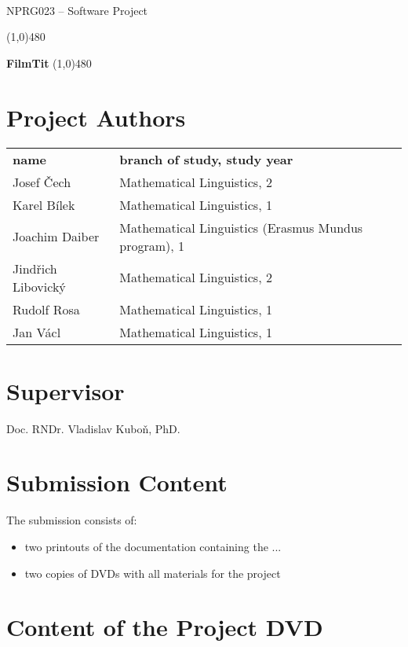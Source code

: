 \documentclass[11pt, oneside]{article}
\begin{document}
 \\
{\large NPRG023 -- Software Project}

\noindent\line(1,0){480}


\vspace*{0.4cm}

\hfill{\fontsize{30mm}{30mm}\bf\sf FilmTit}
\noindent\line(1,0){480}

\section*{Project Authors}

\noindent\begin{tabular}{ll}
\bf name & \bf branch of study, study year \\
\Large Josef Čech & Mathematical Linguistics, 2 \\
\Large Karel Bílek & Mathematical Linguistics, 1\\
\Large Joachim Daiber & Mathematical Linguistics (Erasmus Mundus program), 1\\
\Large Jindřich Libovický & Mathematical Linguistics, 2\\
\Large Rudolf Rosa & Mathematical Linguistics, 1 \\
\Large Jan Václ & Mathematical Linguistics, 1 \\
\end{tabular}

\section*{Supervisor}
Doc. RNDr. Vladislav Kuboň, PhD.

\section*{Submission Content}

The submission consists of:

\begin{itemize}
\item two printouts of the documentation containing the ...

\item two copies of DVDs with all materials for the project
\end{itemize}

\section*{Content of the Project DVD}
\end{document}
